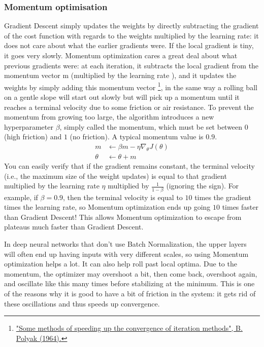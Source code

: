 \subsubsection{Momentum optimisation}
\label{subsec:momentum}
Gradient Descent simply updates the weights by directly subtracting the gradient of the cost function  with regards to the weights multiplied by the learning rate: it does not care about what the earlier gradients were. If the local gradient is tiny, it goes very slowly. Momentum optimization cares a great deal about what previous gradients were: at each iteration, it subtracts the local gradient from the momentum vector m (multiplied by the learning rate ), and it updates the weights by simply adding this momentum vector \footnote{\href{https://homl.info/54}{"Some methods of speeding up the convergence of iteration methods", B. Polyak (1964).}}, in the same way a rolling ball on a gentle slope will start out slowly but will pick up a momentum until it reaches a terminal velocity due to some friction or air resistance. To prevent the momentum from growing too large, the algorithm introduces a new hyperparameter $\beta$, simply called the momentum, which must be set between $0$ (high friction) and $1$ (no friction). A typical momentum value is $0.9$.
\begin{equation}
\begin{aligned}
m &\leftarrow \beta m - \eta \nabla_\theta J(\theta)\\
\theta &\leftarrow \theta + m
\end{aligned}
\end{equation}
You can easily verify that if the gradient remains constant, the terminal velocity (i.e., the maximum size of the weight updates) is equal to that gradient multiplied by the learning rate $\eta$ multiplied by $\frac{1}{1-\beta}$ (ignoring the sign). For example, if $\beta = 0.9$, then the terminal velocity is equal to $10$ times the gradient times the learning rate, so Momentum optimization ends up going $10$ times faster than Gradient Descent! This allows Momentum optimization to escape from plateaus much faster than Gradient Descent.

In deep neural networks that don't use Batch Normalization, the upper layers will often end up having inputs with very different scales, so using Momentum optimization helps a lot. It can also help roll past local optima. Due to the momentum, the optimizer may overshoot a bit, then come back, overshoot again, and oscillate like this many times before stabilizing at the minimum. This is one of the reasons why it is good to have a bit of friction in the system: it gets rid of these oscillations and thus speeds up convergence. 

